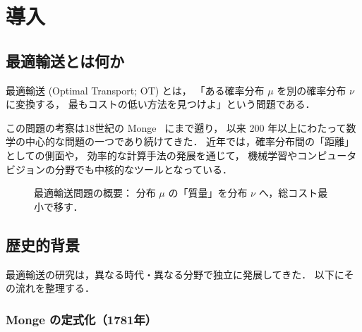 
\chapter{導入}\label{chap:introduction}

\section{最適輸送とは何か}\label{sec:what-is-ot}

最適輸送 (Optimal Transport; OT) とは，
「ある確率分布 $\mu$ を別の確率分布 $\nu$ に変換する，
最もコストの低い方法を見つけよ」という問題である．

この問題の考察は18世紀の Monge~\cite{Monge1781} にまで遡り，
以来 200 年以上にわたって数学の中心的な問題の一つであり続けてきた．
近年では，確率分布間の「距離」としての側面や，
効率的な計算手法の発展を通じて，
機械学習やコンピュータビジョンの分野でも中核的なツールとなっている．

\begin{figure}[htbp]
\centering
{}
\caption{最適輸送問題の概要：
分布 $\mu$ の「質量」を分布 $\nu$ へ，総コスト最小で移す．}
\label{fig:ot-overview}
\end{figure}


\section{歴史的背景}\label{sec:history}

最適輸送の研究は，異なる時代・異なる分野で独立に発展してきた．
以下にその流れを整理する．

\subsection*{Monge の定式化（1781年）}

